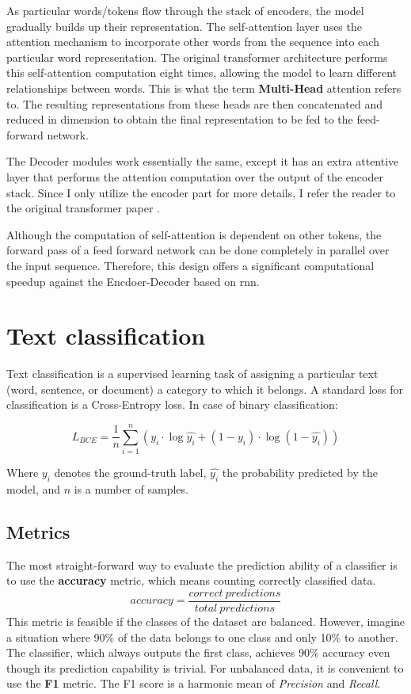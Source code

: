 As particular words/tokens flow through the stack of encoders, the model gradually builds up their representation. The self-attention layer uses the attention mechanism to incorporate other words from the sequence into each particular word representation. The original transformer architecture performs this self-attention computation eight times, allowing the model to learn different relationships between words. This is what the term \textbf{Multi-Head} attention refers to. The resulting representations from these heads are then concatenated and reduced in dimension to obtain the final representation to be fed to the feed-forward network. 

The Decoder modules work essentially the same, except it has an extra attentive layer that performs the attention computation over the output of the encoder stack. Since I only utilize the encoder part for more details, I refer the reader to the original transformer paper \cite{vaswani2017attention}.

Although the computation of self-attention is dependent on other tokens, the forward pass of a feed forward network can be done completely in parallel over the input sequence. Therefore, this design offers a significant computational speedup against the Encdoer-Decoder based on \gls{rnn}.




\section{Text classification}
Text classification is a supervised learning task of assigning a particular text (word, sentence, or document) a category to which it belongs. A standard loss for classification is a Cross-Entropy loss. In case of binary classification:

\begin{equation}
    L_{BCE} = \frac{1}{n} \sum_{i=1}^n ( y_i \cdot \log\hat{y_i} + (1-y_i)\cdot\log(1-\hat{y_i}))
\end{equation}

Where $y_i$ denotes the ground-truth label, $\hat{y_i}$ the probability predicted by the model, and $n$ is a number of samples.


    
\subsection{Metrics}
The most straight-forward way to evaluate the prediction ability of a classifier is to use the \textbf{accuracy} metric, which means counting correctly classified data. 
\begin{equation}
    accuracy = \frac{correct\ predictions}{total\ predictions}
\end{equation}
This metric is feasible if the classes of the dataset are balanced. However, imagine a situation where 90\% of the data belongs to one class and only 10\% to another. The classifier, which always outputs the first class, achieves 90\% accuracy even though its prediction capability is trivial. For unbalanced data, it is convenient to use the \textbf{F1} metric. The F1 score is a harmonic mean of \textit{Precision} and \textit{Recall}.

